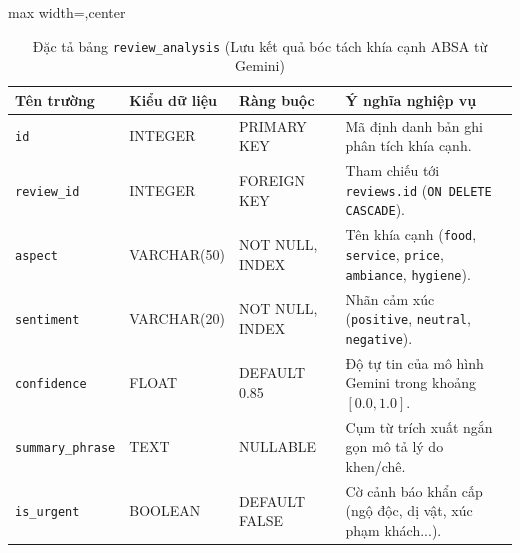 \documentclass[12pt, a4paper]{article}
\begin{document}
\begin{table}[!htbp]
\centering
\caption{Đặc tả bảng \texttt{review\_analysis} (Lưu kết quả bóc tách khía cạnh ABSA từ Gemini)}
\vspace{0.15cm}
\footnotesize
\begin{adjustbox}{max width=\textwidth,center}
\begin{tabularx}{0.97\textwidth}{l l l X}
\toprule
\rowcolor{blue!8}
\textbf{Tên trường} & \textbf{Kiểu dữ liệu} & \textbf{Ràng buộc} & \textbf{Ý nghĩa nghiệp vụ} \\
\midrule
\texttt{id} & INTEGER & PRIMARY KEY & Mã định danh bản ghi phân tích khía cạnh. \\
\texttt{review\_id} & INTEGER & FOREIGN KEY & Tham chiếu tới \texttt{reviews.id} (\texttt{ON DELETE CASCADE}). \\
\texttt{aspect} & VARCHAR(50) & NOT NULL, INDEX & Tên khía cạnh (\texttt{food}, \texttt{service}, \texttt{price}, \texttt{ambiance}, \texttt{hygiene}). \\
\texttt{sentiment} & VARCHAR(20) & NOT NULL, INDEX & Nhãn cảm xúc (\texttt{positive}, \texttt{neutral}, \texttt{negative}). \\
\texttt{confidence} & FLOAT & DEFAULT 0.85 & Độ tự tin của mô hình Gemini trong khoảng $[0.0, 1.0]$. \\
\texttt{summary\_phrase} & TEXT & NULLABLE & Cụm từ trích xuất ngắn gọn mô tả lý do khen/chê. \\
\texttt{is\_urgent} & BOOLEAN & DEFAULT FALSE & Cờ cảnh báo khẩn cấp (ngộ độc, dị vật, xúc phạm khách...). \\
\bottomrule
\end{tabularx}
\end{adjustbox}
\end{table}
\end{document}

